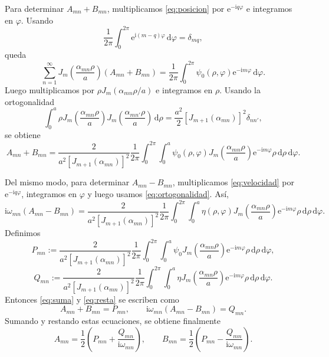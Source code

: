 \documentclass[11pt]{article}
\newcommand{\dd}{\,\mathrm{d}}
\newcommand{\ii}{\mathrm{i}}
\newcommand{\e}{\mathrm{e}}
\begin{document}
Para determinar $A_{mn}+B_{mn}$, multiplicamos \eqref{eq:posicion} por $\e^{-\ii q\varphi}$ e integramos en $\varphi$. Usando
\[
\frac{1}{2\pi}\int_0^{2\pi}\e^{\ii(m-q)\varphi}\dd\varphi=\delta_{mq},
\]
queda
\[
\sum_{n=1}^{\infty}J_{m}\left(\frac{\alpha_{mn}\rho}{a}\right)(A_{mn}+B_{mn})
=\frac{1}{2\pi}\int_0^{2\pi}\psi_0(\rho,\varphi)\e^{-\ii m\varphi}\dd\varphi.
\]
Luego multiplicamos por $\rho J_{m}(\alpha_{mn}\rho/a)$ e integramos en $\rho$. Usando la ortogonalidad
\begin{equation}
\int_0^a \rho J_{m}\left(\frac{\alpha_{mn}\rho}{a}\right)
J_{m}\left(\frac{\alpha_{mn'}\rho}{a}\right)\dd\rho
=\frac{a^2}{2}\left[J_{m+1}(\alpha_{mn})\right]^2\delta_{nn'},
\label{eq:ortogonalidad}
\end{equation}
se obtiene
\begin{equation}
A_{mn}+B_{mn}
=\frac{2}{a^2[J_{m+1}(\alpha_{mn})]^2}
\frac{1}{2\pi}\int_0^{2\pi}\int_0^a
\psi_0(\rho,\varphi)J_{m}\left(\frac{\alpha_{mn}\rho}{a}\right)\e^{-\ii m\varphi}\rho\dd\rho\dd\varphi.
\label{eq:suma}
\end{equation}

Del mismo modo, para determinar $A_{mn}-B_{mn}$, multiplicamos \eqref{eq:velocidad} por $\e^{-\ii q\varphi}$, integramos en $\varphi$ y luego usamos \eqref{eq:ortogonalidad}. Así,
\begin{equation}
\ii\omega_{mn}(A_{mn}-B_{mn})
=\frac{2}{a^2[J_{m+1}(\alpha_{mn})]^2}
\frac{1}{2\pi}\int_0^{2\pi}\int_0^a
\eta(\rho,\varphi)J_{m}\left(\frac{\alpha_{mn}\rho}{a}\right)\e^{-\ii m\varphi}\rho\dd\rho\dd\varphi.
\label{eq:resta}
\end{equation}
Definimos
\[
P_{mn}:=\frac{2}{a^2[J_{m+1}(\alpha_{mn})]^2}
\frac{1}{2\pi}\int_0^{2\pi}\int_0^a
\psi_0J_{m}\left(\frac{\alpha_{mn}\rho}{a}\right)\e^{-\ii m\varphi}\rho\dd\rho\dd\varphi,
\]
\[
Q_{mn}:=\frac{2}{a^2[J_{m+1}(\alpha_{mn})]^2}
\frac{1}{2\pi}\int_0^{2\pi}\int_0^a
\eta J_{m}\left(\frac{\alpha_{mn}\rho}{a}\right)\e^{-\ii m\varphi}\rho\dd\rho\dd\varphi.
\]
Entonces \eqref{eq:suma} y \eqref{eq:resta} se escriben como
\[
A_{mn}+B_{mn}=P_{mn},
\qquad
\ii\omega_{mn}(A_{mn}-B_{mn})=Q_{mn}.
\]
Sumando y restando estas ecuaciones, se obtiene finalmente
\begin{equation}
A_{mn}=\frac{1}{2}\left(P_{mn}+\frac{Q_{mn}}{\ii\omega_{mn}}\right),
\qquad
B_{mn}=\frac{1}{2}\left(P_{mn}-\frac{Q_{mn}}{\ii\omega_{mn}}\right).
\label{eq:coeficientes}
\end{equation}
\end{document}

